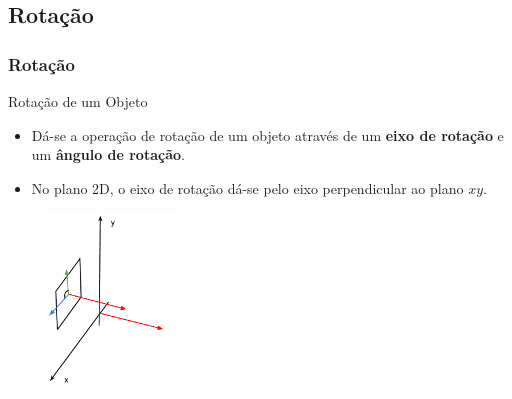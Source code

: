 \documentclass{beamer}
\begin{document}
\subsection{Rotação}
\begin{frame}
\frametitle{Rotação}


	\begin{block}{Rotação de um Objeto}
		\begin{itemize}
			\item Dá-se a operação de rotação de um objeto através de um \textbf{eixo de rotação} e um \textbf{ângulo de rotação}.
			\item No plano 2D, o eixo de rotação dá-se pelo eixo perpendicular ao plano $xy$.
		\end{itemize}
	\end{block}
	
	\begin{figure}[!h]
			\begin{center}
			\includegraphics[width=0.3\textwidth]{Figures/EixoRotacao2D}
			\end{center}
	\end{figure}
	
\end{frame}

\end{document}
